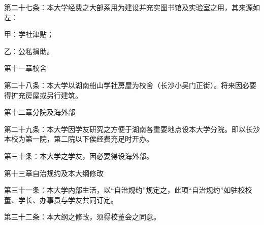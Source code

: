 第二十七条：本大学经费之大部系用为建设并充实图书馆及实验室之用，其来源如左：

甲：学社津贴；

乙：公私捐助。

第十一章校舍

第二十八条：本大学以湖南船山学社房屋为校舍（长沙小吴门正街）。将来因必要得扩充房屋或另行建筑。

第十二章分院及海外部

第二十九条：本大学因学友研究之方便于湖南各重要地点设本大学分院。即以长沙本校为第一院，第二院以下俟经费充足时开办。

第三十条：本大学之学友，因必要得设海外部。

第十三章自治规约及本大纲修改

第三十一条：本大学内部生活，以“自治规约”规定之，此项“自治规约”如驻校校董、学长、办事员与学友共同订定。

第三十二条：本大纲之修改，须得校董会之同意。

